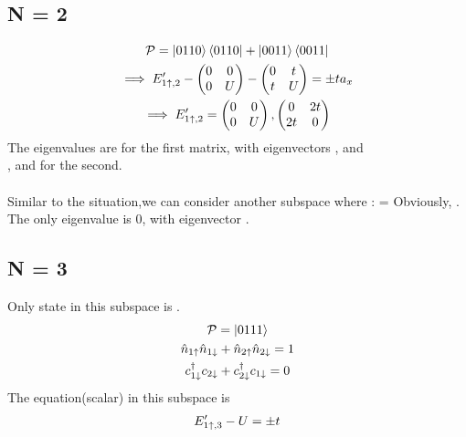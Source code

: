 \documentclass[12pt]{article}
\begin{document}
\subsection{N = 2}

\begin{gather}
        \mathcal{P} = \ket{0110}\bra{0110}+\ket{0011}\bra{0011} \\
        \implies E^\prime_{1\uparrow,2}-\begin{pmatrix} 0 & 0 \\ 0 & U \end{pmatrix} - \begin{pmatrix} 0 & t \\ t & U \end{pmatrix} = \pm t a_x \\
                \implies E^\prime_{1\uparrow,2} = \begin{pmatrix} 0 & 0 \\ 0 & U \end{pmatrix}, \begin{pmatrix} 0 & 2t \\ 2t & 0 \end{pmatrix}
\end{gather}
The eigenvalues are  for the first matrix, with eigenvectors , and\\  ,  and  for the second.\\\\
Similar to the  situation,we can consider another subspace where :
\beq
{} = 
\eeq
Obviously, . The only eigenvalue is 0, with eigenvector \il{\ket{\da,\da}}.

\subsection{N = 3}

Only state in this subspace is .
\begin{gather}
    \mathcal{P} = \ket{0111} \\
    \hat n_{1\uparrow}\hat n_{1\downarrow}+\hat n_{2\uparrow}\hat n_{2\downarrow} = 1 \\
    c_{1\downarrow}^\dagger c_{2\downarrow}+c_{2\downarrow}^\dagger c_{1\downarrow} = 0
\end{gather}
The equation(scalar) in this subspace is 
\begin{gather}
    E^\prime_{1\uparrow,3}-U = \pm t\label{yeah}
\end{gather}
\end{document}

